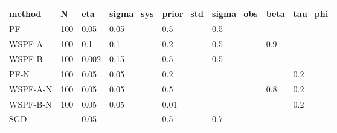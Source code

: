 \begin{tabular}{llllllll}
\hline
method & N & eta & sigma\_sys & prior\_std & sigma\_obs & beta & tau\_phi \\
\hline
PF & 100 & 0.05 & 0.05 & 0.5 & 0.5 &  &  \\
WSPF-A & 100 & 0.1 & 0.1 & 0.2 & 0.5 & 0.9 &  \\
WSPF-B & 100 & 0.002 & 0.15 & 0.5 & 0.5 &  &  \\
PF-N & 100 & 0.05 & 0.05 & 0.2 &  &  & 0.2 \\
WSPF-A-N & 100 & 0.05 & 0.05 & 0.5 &  & 0.8 & 0.2 \\
WSPF-B-N & 100 & 0.05 & 0.05 & 0.01 &  &  & 0.2 \\
SGD & - & 0.05 &  & 0.5 & 0.7 &  &  \\
\hline
\end{tabular}
